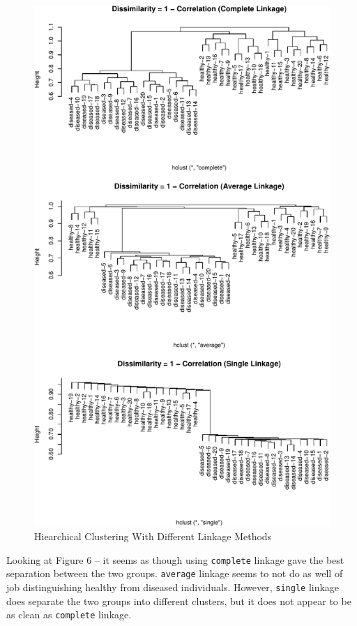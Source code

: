 \documentclass[]{article}
\begin{document}
\begin{figure}[htbp]
\centering
\includegraphics{sta546_hw2_files/figure-latex/unnamed-chunk-16-1.pdf}
\caption{Hiearchical Clustering With Different Linkage Methods}
\end{figure}

Looking at Figure 6 -- it seems as though using \texttt{complete}
linkage gave the best separation between the two groups.
\texttt{average} linkage seems to not do as well of job distinguishing
healthy from diseased individuals. However, \texttt{single} linkage does
separate the two groups into different clusters, but it does not appear
to be as clean as \texttt{complete} linkage.
\end{document}
